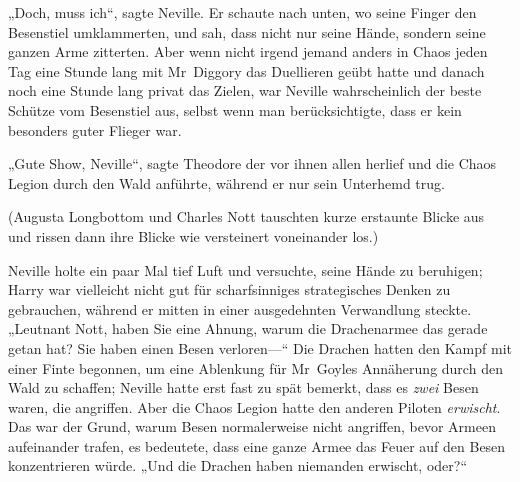 „Doch, muss ich“, sagte Neville. Er schaute nach unten, wo seine Finger den Besenstiel umklammerten, und sah, dass nicht nur seine Hände, sondern seine ganzen Arme zitterten. Aber wenn nicht irgend jemand anders in Chaos jeden Tag eine Stunde lang mit Mr~Diggory das Duellieren geübt hatte und danach noch eine Stunde lang privat das Zielen, war Neville wahrscheinlich der beste Schütze vom Besenstiel aus, selbst wenn man berücksichtigte, dass er kein besonders guter Flieger war.

„Gute Show, Neville“, sagte Theodore der vor ihnen allen herlief und die Chaos Legion durch den Wald anführte, während er nur sein Unterhemd trug.

(Augusta Longbottom und Charles Nott tauschten kurze erstaunte Blicke aus und rissen dann ihre Blicke wie versteinert voneinander los.)

Neville holte ein paar Mal tief Luft und versuchte, seine Hände zu beruhigen; Harry war vielleicht nicht gut für scharfsinniges strategisches Denken zu gebrauchen, während er mitten in einer ausgedehnten Verwandlung steckte. „Leutnant Nott, haben Sie eine Ahnung, warum die Drachenarmee das gerade getan hat? Sie haben einen Besen verloren—“ Die Drachen hatten den Kampf mit einer Finte begonnen, um eine Ablenkung für Mr~Goyles Annäherung durch den Wald zu schaffen; Neville hatte erst fast zu spät bemerkt, dass es \emph{zwei} Besen waren, die angriffen. Aber die Chaos Legion hatte den anderen Piloten \emph{erwischt}. Das war der Grund, warum Besen normalerweise nicht angriffen, bevor Armeen aufeinander trafen, es bedeutete, dass eine ganze Armee das Feuer auf den Besen konzentrieren würde. „Und die Drachen haben niemanden erwischt, oder?“

